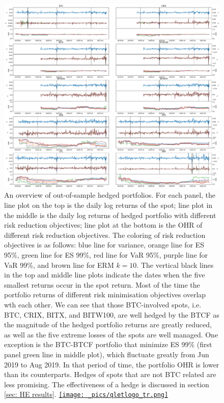 \begin{figure}[ht]
    \centering
    \includegraphics[width=\textwidth]{_pics/overview.pdf}
  \caption{An overview of out-of-sample hedged portfolios.
            For each panel, the line plot on the top is the daily log returns of the spot;
            line plot in the middle is the daily log returns of hedged portfolio with different risk reduction objectives;
            line plot at the bottom is the OHR of different risk reduction objectives. The coloring of risk reduction objectives is as follows:
                                      \textcolor{plt1}{blue line} for variance,
                                      \textcolor{plt2}{orange line} for ES 95\%,
                                      \textcolor{plt3}{green line} for ES 99\%,
                                      \textcolor{plt4}{red line} for VaR 95\%,
                                      \textcolor{plt5}{purple line} for VaR 99\%, and
                                      \textcolor{plt6}{brown line} for ERM $k=10$.
            The vertical black lines in the top and middle line plots indicate the dates when the five smallest returns occur in the spot return.
            Most of the time the portfolio returns of different risk minimisation objectives overlap wth each other.
            We can see that those BTC-involved spots, i.e. BTC, CRIX, BITX, and BITW100,  are well hedged by the BTCF as the magnitude of the hedged portfolio returns are greatly reduced,
            as well as the five extreme losses of the spots are well managed.
            One exception is the BTC-BTCF portfolio that minimize ES 99\% (first panel green line in middle plot), which fluctuate greatly from Jun 2019 to Aug 2019.
            In that period of time, the portfolio OHR is lower than its counterparts.
            Hedges of spots that are not BTC related are less promising.
            The effectiveness of a hedge is discussed in section \ref{sec: HE results}.
  \href{http://www.quantlet.com/}{\texttt{[image: \_pics/qletlogo\_tr.png]}} }
\label{fig:overview}
\end{figure}

